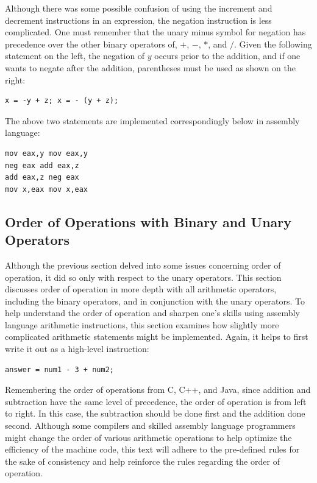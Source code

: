 \documentclass[10pt]{book}
\begin{document}
Although there was some possible confusion of using the increment and decrement instructions in an expression, the negation instruction is less complicated. One must remember that the unary minus symbol for negation has precedence over the other binary operators of, $+$, $-$, $*$, and $/$. Given the following statement on the left, the negation of $y$ occurs prior to the addition, and if one wants to negate after the addition, parentheses must be used as shown on the right:

\begin{verbatim}
x = -y + z; x = - (y + z);
\end{verbatim}

The above two statements are implemented correspondingly below in assembly language:

\begin{verbatim}
mov eax,y mov eax,y
neg eax add eax,z
add eax,z neg eax
mov x,eax mov x,eax
\end{verbatim}

\subsection{Order of Operations with Binary and Unary Operators}
Although the previous section delved into some issues concerning order of operation, it did so only with respect to the unary operators. This section discusses order of operation in more depth with all arithmetic operators, including the binary operators, and in conjunction with the unary operators. To help understand the order of operation and sharpen one's skills using assembly language arithmetic instructions, this section examines how slightly more complicated arithmetic statements might be implemented. Again, it helps to first write it out as a high-level instruction:

\begin{verbatim}
answer = num1 - 3 + num2;
\end{verbatim}

Remembering the order of operations from C, C++, and Java, since addition and subtraction have the same level of precedence, the order of operation is from left to right. In this case, the subtraction should be done first and the addition done second. Although some compilers and skilled assembly language programmers might change the order of various arithmetic operations to help optimize the efficiency of the machine code, this text will adhere to the pre-defined rules for the sake of consistency and help reinforce the rules regarding the order of operation.
\end{document}
